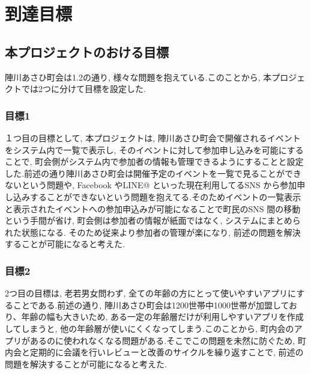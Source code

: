 \chapter{到達目標}

\section{本プロジェクトのおける目標}
  陣川あさひ町会は1.2の通り, 様々な問題を抱えている.このことから, 本プロジェクトでは2つに分けて目標を設定した.

\subsection{目標1}
  １つ目の目標として, 本プロジェクトは, 陣川あさひ町会で開催されるイベントをシステム内で一覧で表示し, そのイベントに対して参加申し込みを可能にすることで, 町会側がシステム内で参加者の情報も管理できるようにすることと設定した.前述の通り陣川あさひ町会は開催予定のイベントを一覧で見ることができないという問題や, Facebook やLINE@ といった現在利用してるSNS から参加申し込みすることができないという問題を抱えてる.そのためイベントの一覧表示と表示されたイベントへの参加申込みが可能になることで町民のSNS 間の移動という手間が省け, 町会側は参加者の情報が紙面ではなく, システムにまとめられた状態になる. そのため従来より参加者の管理が楽になり, 前述の問題を解決することが可能になると考えた.\\

\subsection{目標2}
  2つ目の目標は, 老若男女問わず, 全ての年齢の方にとって使いやすいアプリにすることである.前述の通り, 陣川あさひ町会は1200世帯中1000世帯が加盟しており、年齢の幅も大きいため, ある一定の年齢層だけが利用しやすいアプリを作成してしまうと, 他の年齢層が使いにくくなってしまう.このことから, 町内会のアプリがあるのに使われなくなる問題がある.そこでこの問題を未然に防ぐため, 町内会と定期的に会議を行いレビューと改善のサイクルを繰り返すことで, 前述の問題を解決することが可能になると考えた.\\

